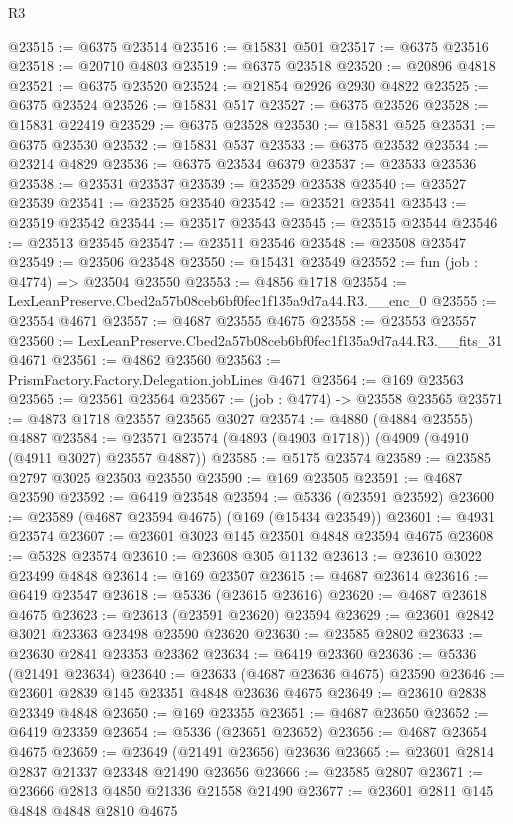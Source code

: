 \begin{lexlean}{R3}
\begin{coremodule}
@23515 := @6375 @23514
@23516 := @15831 @501
@23517 := @6375 @23516
@23518 := @20710 @4803
@23519 := @6375 @23518
@23520 := @20896 @4818
@23521 := @6375 @23520
@23524 := @21854 @2926 @2930 @4822
@23525 := @6375 @23524
@23526 := @15831 @517
@23527 := @6375 @23526
@23528 := @15831 @22419
@23529 := @6375 @23528
@23530 := @15831 @525
@23531 := @6375 @23530
@23532 := @15831 @537
@23533 := @6375 @23532
@23534 := @23214 @4829
@23536 := @6375 @23534 @6379
@23537 := @23533 @23536
@23538 := @23531 @23537
@23539 := @23529 @23538
@23540 := @23527 @23539
@23541 := @23525 @23540
@23542 := @23521 @23541
@23543 := @23519 @23542
@23544 := @23517 @23543
@23545 := @23515 @23544
@23546 := @23513 @23545
@23547 := @23511 @23546
@23548 := @23508 @23547
@23549 := @23506 @23548
@23550 := @15431 @23549
@23552 := fun (job : @4774) => @23504 @23550
@23553 := @4856 @1718
@23554 := LexLeanPreserve.Cbed2a57b08ceb6bf0fec1f135a9d7a44.R3.__enc_0
@23555 := @23554 @4671
@23557 := @4687 @23555 @4675
@23558 := @23553 @23557
@23560 := LexLeanPreserve.Cbed2a57b08ceb6bf0fec1f135a9d7a44.R3.__fits_31 @4671
@23561 := @4862 @23560
@23563 := PrismFactory.Factory.Delegation.jobLines @4671
@23564 := @169 @23563
@23565 := @23561 @23564
@23567 := (job : @4774) -> @23558 @23565
@23571 := @4873 @1718 @23557 @23565 @3027
@23574 := @4880 (@4884 @23555) @4887
@23584 := @23571 @23574 (@4893 (@4903 @1718)) (@4909 (@4910 (@4911 @3027) @23557 @4887))
@23585 := @5175 @23574
@23589 := @23585 @2797 @3025 @23503 @23550
@23590 := @169 @23505
@23591 := @4687 @23590
@23592 := @6419 @23548
@23594 := @5336 (@23591 @23592)
@23600 := @23589 (@4687 @23594 @4675) (@169 (@15434 @23549))
@23601 := @4931 @23574
@23607 := @23601 @3023 @145 @23501 @4848 @23594 @4675
@23608 := @5328 @23574
@23610 := @23608 @305 @1132
@23613 := @23610 @3022 @23499 @4848
@23614 := @169 @23507
@23615 := @4687 @23614
@23616 := @6419 @23547
@23618 := @5336 (@23615 @23616)
@23620 := @4687 @23618 @4675
@23623 := @23613 (@23591 @23620) @23594
@23629 := @23601 @2842 @3021 @23363 @23498 @23590 @23620
@23630 := @23585 @2802
@23633 := @23630 @2841 @23353 @23362
@23634 := @6419 @23360
@23636 := @5336 (@21491 @23634)
@23640 := @23633 (@4687 @23636 @4675) @23590
@23646 := @23601 @2839 @145 @23351 @4848 @23636 @4675
@23649 := @23610 @2838 @23349 @4848
@23650 := @169 @23355
@23651 := @4687 @23650
@23652 := @6419 @23359
@23654 := @5336 (@23651 @23652)
@23656 := @4687 @23654 @4675
@23659 := @23649 (@21491 @23656) @23636
@23665 := @23601 @2814 @2837 @21337 @23348 @21490 @23656
@23666 := @23585 @2807
@23671 := @23666 @2813 @4850 @21336 @21558 @21490
@23677 := @23601 @2811 @145 @4848 @4848 @2810 @4675

\end{coremodule}
\end{lexlean}
